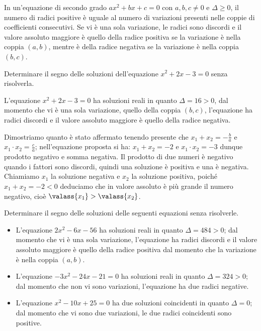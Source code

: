 \begin{teorema}[di Cartesio]
In un’equazione di secondo grado $a x^{2} + b x + c = 0$ con $a, b, c \neq 0$ e $\Delta \geq 0$, il numero di radici positive è uguale al numero di variazioni presenti nelle coppie di coefficienti consecutivi. Se vi è una sola variazione, le radici sono discordi e il valore assoluto maggiore è quello della radice positiva se la variazione è nella coppia $(a,b)$, mentre è della radice negativa se la variazione è nella coppia $(b,c)$.
\end{teorema}

\begin{exrig}
\begin{esempio}
Determinare il segno delle soluzioni dell'equazione $x^2 + 2 x - 3 = 0$ senza risolverla.

L'equazione $x^2 + 2 x - 3 = 0$ ha soluzioni reali in quanto $\Delta = 16 > 0$, dal momento che vi è una sola variazione, quello della coppia $(b,c)$, l’equazione ha radici discordi e il valore assoluto maggiore è quello della radice negativa.

Dimostriamo quanto è stato affermato tenendo presente che $x_{1} + x_{2} = - \frac{b}{a}$ e $x_{1}\cdot x_{2} = \frac{c}{a}$; nell’equazione proposta si ha:
$x_{1} + x_{2} = - 2$ e $x_{1} \cdot x_{2} = - 3$ dunque prodotto negativo e somma negativa. Il prodotto di due numeri è negativo quando i fattori sono discordi, quindi una soluzione è positiva e una è negativa. Chiamiamo $x_1$ la soluzione negativa e $x_2$ la soluzione positiva, poiché $x_{1} + x_{2} = - 2 < 0$
deduciamo che in valore assoluto è più grande il numero negativo, cioè $\valass{x_{1}} > \valass{x_{2}}$.
\end{esempio}

\begin{esempio}
Determinare il segno delle soluzioni delle seguenti equazioni senza risolverle.
\begin{itemize}
	\item L'equazione $2 x^{2} - 6 x - 56$ ha soluzioni reali in quanto $\Delta = 484 > 0$; dal momento che vi è una sola variazione, l’equazione ha radici discordi
	e il valore assoluto maggiore è quello della radice positiva dal momento che la variazione è nella coppia $(a,b)$.
	\item L’equazione 	$- 3 x^{2} - 24 x - 21 = 0$ ha soluzioni reali in quanto $\Delta = 324 > 0$; dal momento che non vi sono variazioni, l’equazione ha due radici
	negative.
	\item L’equazione 	$x^{2} - 10 x + 25 = 0$ ha due soluzioni coincidenti in quanto $\Delta = 0$; dal momento che vi sono due variazioni, le due radici coincidenti sono positive.
\end{itemize}
\end{esempio}
\end{exrig}
\vspazio{}

